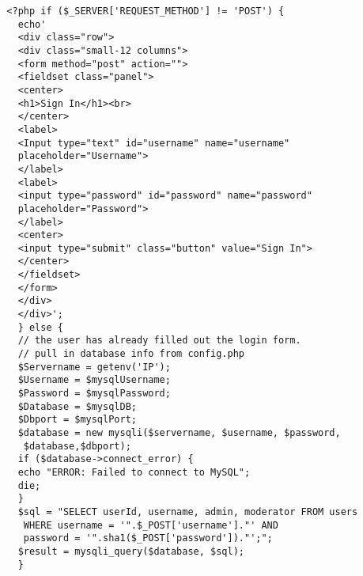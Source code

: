 \begin{verbatim}
  <?php if ($_SERVER['REQUEST_METHOD'] != 'POST') { 
    echo'
    <div class="row">
    <div class="small-12 columns">
    <form method="post" action="">
    <fieldset class="panel">
    <center>
    <h1>Sign In</h1><br>
    </center>
    <label>
    <Input type="text" id="username" name="username" 
    placeholder="Username">
    </label>
    <label>
    <input type="password" id="password" name="password" 
    placeholder="Password">
    </label>
    <center>
    <input type="submit" class="button" value="Sign In">
    </center>
    </fieldset>
    </form>
    </div>
    </div>';
    } else {
    // the user has already filled out the login form.
    // pull in database info from config.php
    $Servername = getenv('IP');
    $Username = $mysqlUsername;
    $Password = $mysqlPassword;
    $Database = $mysqlDB;
    $Dbport = $mysqlPort;
    $database = new mysqli($servername, $username, $password,
     $database,$dbport);
    if ($database->connect_error) {
    echo "ERROR: Failed to connect to MySQL";
    die;
    }
    $sql = "SELECT userId, username, admin, moderator FROM users
     WHERE username = '".$_POST['username']."' AND 
     password = '".sha1($_POST['password'])."';";
    $result = mysqli_query($database, $sql);
    }
\end{verbatim}
